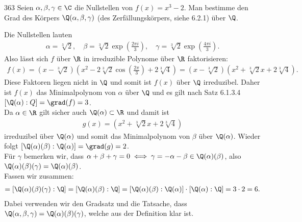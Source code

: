 \begin{algebraUE}{363}
  Seien $\alpha, \beta, \gamma \in \C$ die Nullstellen von $f(x) = x^3 - 2.$ Man bestimme den Grad des Körpers $\Q(\alpha, \beta, \gamma)$ (des Zerfällungskörpers, siehe 6.2.1) über $\Q$.
\end{algebraUE}

\begin{solution}
Die Nullstellen lauten
\begin{align*}
  \alpha = \sqrt[3]{2}, \quad \beta = \sqrt[3]{2}\exp\left(\frac{2\pi i}{3}\right), \quad \gamma = \sqrt[3]{2}\exp\left(\frac{4\pi i}{3}\right).
\end{align*}
Also lässt sich $f$ über $\R$ in irreduzible Polynome über $\R$ faktorisieren:
\begin{align*}
  f(x) = \left(x - \sqrt[3]{2}\right)\left(x^2 - 2\sqrt[3]{2}\cos\left(\frac{2\pi}{3}\right) +
  2\sqrt[3]{4}\right) = \left(x - \sqrt[3]{2}\right)\left(x^2 + \sqrt[3]{2} x + 2\sqrt[3]{4}\right).
\end{align*}
Diese Faktoren liegen nicht in $\Q$ und somit ist $f(x)$ über $\Q$ irreduzibel.
Daher ist $f(x)$ das Minimalpolynom von $\alpha$ über $\Q$ und es gilt nach Satz 6.1.3.4
$[\Q(\alpha): Q] = \grad(f) = 3$. \\
Da $\alpha \in \R$ gilt sicher auch $\Q(\alpha) \subset \R$ und damit ist
\begin{align*}
  g(x) = \left(x^2 + \sqrt[3]{2} x + 2\sqrt[3]{4}\right)
\end{align*}
irreduzibel über $\Q(\alpha)$ und somit das Minimalpolynom von $\beta$ über $\Q(\alpha)$.
Wieder folgt $[\Q(\alpha)(\beta): \Q(\alpha)] = \grad(g) = 2$. \\
Für $\gamma$ bemerken wir, dass $\alpha + \beta + \gamma = 0 \iff \gamma = -\alpha - \beta \in \Q(\alpha)(\beta)$,
also $\Q(\alpha)(\beta)(\gamma) = \Q(\alpha)(\beta)$. \\
Fassen wir zusammen:
\begin{align*}
  [\Q(\alpha,\beta,\gamma): \Q] =  [\Q(\alpha)(\beta)(\gamma): \Q]
  = [\Q(\alpha)(\beta): \Q] = [\Q(\alpha)(\beta): \Q(\alpha)]\cdot[\Q(\alpha): \Q] = 3\cdot2= 6.
\end{align*}
Dabei verwenden wir den Gradsatz und die Tatsache, dass $\Q(\alpha,\beta,\gamma) = \Q(\alpha)(\beta)(\gamma)$,
welche aus der Definition klar ist.
\end{solution}
